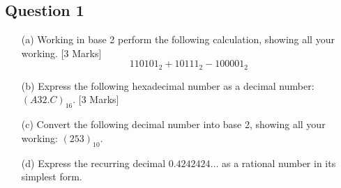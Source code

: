 \documentclass[a4paper,12pt]{article}
\begin{document}

\subsection*{Question 1}
\begin{itemize}
\item[(a)] Working in base 2 perform the following calculation, showing all your working. [3 Marks]
\[110101_2 + 10111_2 - 100001_2\]
\item[(b)] Express the following hexadecimal number as a decimal number: $(A32.C)_{16}$.
[3 Marks]
\item[(c)] Convert the following decimal number into base 2, showing all your working:
$(253)_{10}$. \newline [2 Marks]
\item[(d)]  Express the recurring decimal $0.4242424\ldots$
 as a rational number in its simplest
form.\newline [2 Marks]
\end{itemize}



\end{document}
